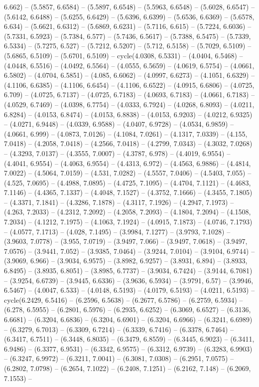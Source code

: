 6.662) -- (5.5857, 6.6584) -- (5.5897, 6.6548) -- (5.5963, 6.6548) -- (5.6028, 6.6547) -- (5.6142, 6.6488) -- (5.6255, 6.6429) -- (5.6396, 6.6399) -- (5.6536, 6.6369) -- (5.6578, 6.634) -- (5.6621, 6.6312) -- (5.6869, 6.6231) -- (5.7116, 6.615) -- (5.7224, 6.6036) -- (5.7331, 6.5923) -- (5.7384, 6.577) -- (5.7436, 6.5617) -- (5.7388, 6.5475) -- (5.7339, 6.5334) -- (5.7275, 6.527) -- (5.7212, 6.5207) -- (5.712, 6.5158) -- (5.7029, 6.5109) -- (5.6865, 6.5109) -- (5.6701, 6.5109) -- cycle(4.0308, 6.5331) -- (4.0404, 6.5468) -- (4.0448, 6.5516) -- (4.0492, 6.5564) -- (4.0555, 6.5659) -- (4.0619, 6.5754) -- (4.0661, 6.5802) -- (4.0704, 6.5851) -- (4.085, 6.6062) -- (4.0997, 6.6273) -- (4.1051, 6.6329) -- (4.1106, 6.6385) -- (4.1106, 6.6454) -- (4.1106, 6.6522) -- (4.0915, 6.6806) -- (4.0725, 6.709) -- (4.0725, 6.7137) -- (4.0725, 6.7183) -- (4.0693, 6.7183) -- (4.0661, 6.7183) -- (4.0529, 6.7469) -- (4.0398, 6.7754) -- (4.0333, 6.7924) -- (4.0268, 6.8093) -- (4.0211, 6.8284) -- (4.0153, 6.8474) -- (4.0153, 6.8838) -- (4.0153, 6.9203) -- (4.0212, 6.9325) -- (4.0271, 6.9448) -- (4.0339, 6.9588) -- (4.0407, 6.9728) -- (4.0534, 6.9859) -- (4.0661, 6.999) -- (4.0873, 7.0126) -- (4.1084, 7.0261) -- (4.1317, 7.0339) -- (4.155, 7.0418) -- (4.2058, 7.0418) -- (4.2566, 7.0418) -- (4.2799, 7.0343) -- (4.3032, 7.0268) -- (4.3293, 7.0137) -- (4.3555, 7.0007) -- (4.3787, 6.978) -- (4.4019, 6.9554) -- (4.4041, 6.9554) -- (4.4063, 6.9554) -- (4.4313, 6.972) -- (4.4563, 6.9886) -- (4.4814, 7.0022) -- (4.5064, 7.0159) -- (4.531, 7.0282) -- (4.5557, 7.0406) -- (4.5403, 7.055) -- (4.525, 7.0695) -- (4.4988, 7.0895) -- (4.4725, 7.1095) -- (4.4704, 7.1121) -- (4.4683, 7.1146) -- (4.4365, 7.1337) -- (4.4048, 7.1527) -- (4.3752, 7.1666) -- (4.3455, 7.1805) -- (4.3371, 7.1841) -- (4.3286, 7.1878) -- (4.3117, 7.1926) -- (4.2947, 7.1973) -- (4.263, 7.2033) -- (4.2312, 7.2092) -- (4.2058, 7.2093) -- (4.1804, 7.2094) -- (4.1508, 7.2034) -- (4.1212, 7.1975) -- (4.1063, 7.1924) -- (4.0915, 7.1873) -- (4.0746, 7.1793) -- (4.0577, 7.1713) -- (4.028, 7.1495) -- (3.9984, 7.1277) -- (3.9793, 7.1028) -- (3.9603, 7.0778) -- (3.955, 7.0719) -- (3.9497, 7.066) -- (3.9497, 7.0618) -- (3.9497, 7.0576) -- (3.9441, 7.052) -- (3.9385, 7.0464) -- (3.9244, 7.0104) -- (3.9104, 6.9744) -- (3.9069, 6.966) -- (3.9034, 6.9575) -- (3.8982, 6.9257) -- (3.8931, 6.894) -- (3.8933, 6.8495) -- (3.8935, 6.8051) -- (3.8985, 6.7737) -- (3.9034, 6.7424) -- (3.9144, 6.7081) -- (3.9254, 6.6739) -- (3.9445, 6.6336) -- (3.9636, 6.5934) -- (3.9791, 6.57) -- (3.9946, 6.5467) -- (4.0047, 6.533) -- (4.0148, 6.5193) -- (4.0179, 6.5193) -- (4.0211, 6.5193) -- cycle(6.2429, 6.5416) -- (6.2596, 6.5638) -- (6.2677, 6.5786) -- (6.2759, 6.5934) -- (6.278, 6.5955) -- (6.2801, 6.5976) -- (6.2935, 6.6252) -- (6.3069, 6.6527) -- (6.3136, 6.6681) -- (6.3204, 6.6836) -- (6.3204, 6.6901) -- (6.3204, 6.6966) -- (6.3241, 6.6989) -- (6.3279, 6.7013) -- (6.3309, 6.7214) -- (6.3339, 6.7416) -- (6.3378, 6.7464) -- (6.3417, 6.7511) -- (6.3448, 6.8035) -- (6.3479, 6.8559) -- (6.3445, 6.9023) -- (6.3411, 6.9486) -- (6.3377, 6.9531) -- (6.3342, 6.9575) -- (6.3312, 6.9739) -- (6.3283, 6.9903) -- (6.3247, 6.9972) -- (6.3211, 7.0041) -- (6.3081, 7.0308) -- (6.2951, 7.0575) -- (6.2802, 7.0798) -- (6.2654, 7.1022) -- (6.2408, 7.1251) -- (6.2162, 7.148) -- (6.2069, 7.1553) -- 